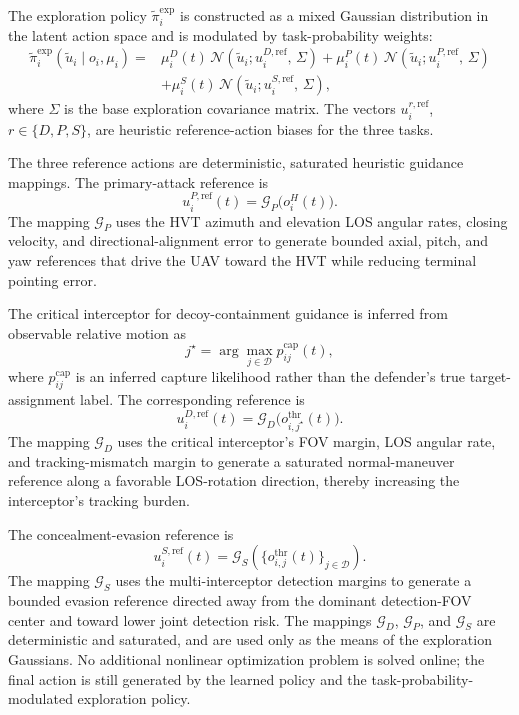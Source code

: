 \documentclass{cja}
\begin{document}
The exploration policy $\widetilde\pi_i^{\mathrm{exp}}$ is constructed as a mixed Gaussian distribution in the latent action space and is modulated by task-probability weights:
\begin{equation}
\begin{aligned}
\widetilde\pi_i^{\mathrm{exp}}(\widetilde u_i\mid o_i,\mu_i)
={}&
\mu_i^D(t)\,\mathcal{N}\!\left(\widetilde u_i;u_i^{D,\mathrm{ref}},\,\Sigma\right)
+
\mu_i^P(t)\,\mathcal{N}\!\left(\widetilde u_i;u_i^{P,\mathrm{ref}},\,\Sigma\right)\\
&+
\mu_i^S(t)\,\mathcal{N}\!\left(\widetilde u_i;u_i^{S,\mathrm{ref}},\,\Sigma\right),
\end{aligned}
\end{equation}
where $\Sigma$ is the base exploration covariance matrix. The vectors $u_i^{r,\mathrm{ref}}$, $r\in\{D,P,S\}$, are heuristic reference-action biases for the three tasks.

The three reference actions are deterministic, saturated heuristic guidance mappings. The primary-attack reference is
\begin{equation}
u_i^{P,\mathrm{ref}}(t)
=\mathcal G_P\bigl(o_i^H(t)\bigr).
\end{equation}
The mapping $\mathcal G_P$ uses the HVT azimuth and elevation LOS angular rates, closing velocity, and directional-alignment error to generate bounded axial, pitch, and yaw references that drive the UAV toward the HVT while reducing terminal pointing error.

The critical interceptor for decoy-containment guidance is inferred from observable relative motion as
\begin{equation}
j^\star
=
\arg\max_{j\in\mathcal D}p_{ij}^{\mathrm{cap}}(t),
\end{equation}
where $p_{ij}^{\mathrm{cap}}$ is an inferred capture likelihood rather than the defender's true target-assignment label. The corresponding reference is
\begin{equation}
u_i^{D,\mathrm{ref}}(t)
=\mathcal G_D\bigl(o_{i,j^\star}^{\mathrm{thr}}(t)\bigr).
\end{equation}
The mapping $\mathcal G_D$ uses the critical interceptor's FOV margin, LOS angular rate, and tracking-mismatch margin to generate a saturated normal-maneuver reference along a favorable LOS-rotation direction, thereby increasing the interceptor's tracking burden.

The concealment-evasion reference is
\begin{equation}
u_i^{S,\mathrm{ref}}(t)
=\mathcal G_S\!\left(\{o_{i,j}^{\mathrm{thr}}(t)\}_{j\in\mathcal D}\right).
\end{equation}
The mapping $\mathcal G_S$ uses the multi-interceptor detection margins to generate a bounded evasion reference directed away from the dominant detection-FOV center and toward lower joint detection risk. The mappings $\mathcal G_D$, $\mathcal G_P$, and $\mathcal G_S$ are deterministic and saturated, and are used only as the means of the exploration Gaussians. No additional nonlinear optimization problem is solved online; the final action is still generated by the learned policy and the task-probability-modulated exploration policy.
\end{document}
